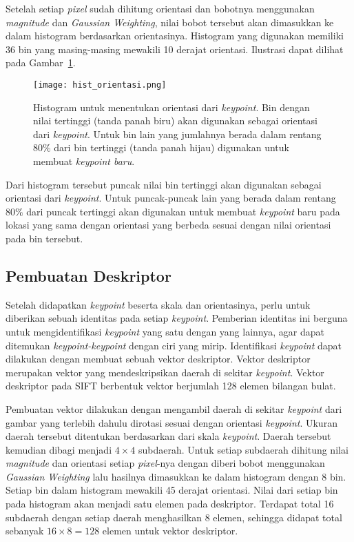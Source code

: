 Setelah setiap \textit{pixel} sudah dihitung orientasi dan bobotnya menggunakan \textit{magnitude} dan \textit{Gaussian Weighting}, nilai bobot tersebut akan dimasukkan ke dalam histogram berdasarkan orientasinya. Histogram yang digunakan memiliki 36 bin yang masing-masing mewakili 10 derajat orientasi. Ilustrasi dapat dilihat pada Gambar~\ref{fig:hist_orientasi}.
\begin{figure}[H]
	\centering
	\texttt{[image: hist\_orientasi.png]}
	\caption{Histogram untuk menentukan orientasi dari \textit{keypoint}. Bin dengan nilai tertinggi (tanda panah biru) akan digunakan sebagai orientasi dari \textit{keypoint}. Untuk bin lain yang jumlahnya berada dalam rentang $80\%$ dari bin tertinggi (tanda panah hijau) digunakan untuk membuat \textit{keypoint baru}.}
	\label{fig:hist_orientasi}
\end{figure}

Dari histogram tersebut puncak nilai bin tertinggi akan digunakan sebagai orientasi dari \textit{keypoint}. Untuk puncak-puncak lain yang berada dalam rentang $80\%$ dari puncak tertinggi akan digunakan untuk membuat \textit{keypoint} baru pada lokasi yang sama dengan orientasi yang berbeda sesuai dengan nilai orientasi pada bin tersebut.

\subsection{Pembuatan Deskriptor}
Setelah didapatkan \textit{keypoint} beserta skala dan orientasinya, perlu untuk diberikan sebuah identitas pada setiap \textit{keypoint}. Pemberian identitas ini berguna untuk mengidentifikasi \textit{keypoint} yang satu dengan yang lainnya, agar dapat ditemukan \textit{keypoint-keypoint} dengan ciri yang mirip. Identifikasi \textit{keypoint} dapat dilakukan dengan membuat sebuah vektor deskriptor. Vektor deskriptor merupakan vektor yang mendeskripsikan daerah di sekitar \textit{keypoint}. Vektor deskriptor pada SIFT berbentuk vektor berjumlah 128 elemen bilangan bulat.

Pembuatan vektor dilakukan dengan mengambil daerah di sekitar \textit{keypoint} dari gambar yang terlebih dahulu dirotasi sesuai dengan orientasi \textit{keypoint}. Ukuran daerah tersebut ditentukan berdasarkan dari skala \textit{keypoint}. Daerah tersebut kemudian dibagi menjadi $4\times4$ subdaerah. Untuk setiap subdaerah dihitung nilai \textit{magnitude} dan orientasi setiap \textit{pixel}-nya dengan diberi bobot menggunakan \textit{Gaussian Weighting} lalu hasilnya dimasukkan ke dalam histogram dengan 8 bin. Setiap bin dalam histogram mewakili 45 derajat orientasi. Nilai dari setiap bin pada histogram akan menjadi satu elemen pada deskriptor. Terdapat total 16 subdaerah dengan setiap daerah menghasilkan 8 elemen, sehingga didapat total sebanyak $16\times8=128$ elemen untuk vektor deskriptor. 

